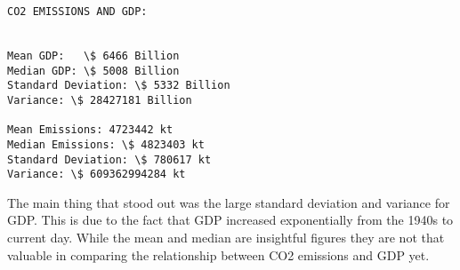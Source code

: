 \documentclass[11pt]{article}
\begin{document}
    \begin{Verbatim}[commandchars=\\\{\}]
CO2 EMISSIONS AND GDP:


Mean GDP:   \$ 6466 Billion
Median GDP: \$ 5008 Billion
Standard Deviation: \$ 5332 Billion
Variance: \$ 28427181 Billion

Mean Emissions: 4723442 kt
Median Emissions: \$ 4823403 kt
Standard Deviation: \$ 780617 kt
Variance: \$ 609362994284 kt

    \end{Verbatim}

    The main thing that stood out was the large standard deviation and
variance for GDP. This is due to the fact that GDP increased
exponentially from the 1940s to current day. While the mean and median
are insightful figures they are not that valuable in comparing the
relationship between CO2 emissions and GDP yet.
\end{document}
